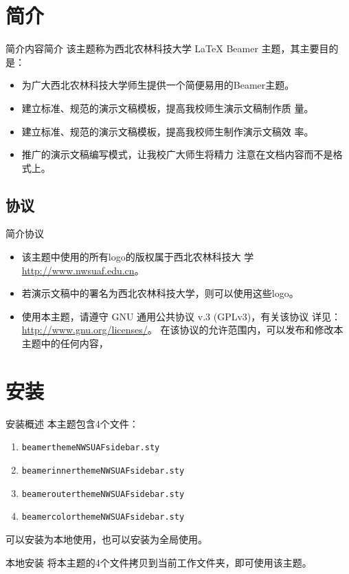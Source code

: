 \section{简介}
\begin{frame}{简介}{内容简介}
  该主题称为\alert{西北农林科技大学 {\LaTeX} Beamer 主题}，其主要目的
  是：
  \begin{itemize}
  \item<1-> 为广大西北农林科技大学师生提供一个简便易用的Beamer主题。
  \item<2-> 建立标准、规范的演示文稿模板，提高我校师生演示文稿制作质
    量。
  \item<3-> 建立标准、规范的演示文稿模板，提高我校师生制作演示文稿效
    率。
  \item<4-> 推广的演示文稿编写模式，让我校广大师生将精力
    注意在文档内容而不是格式上。
  \end{itemize}
\end{frame}

\subsection{协议}
\begin{frame}{简介}{协议}
  \begin{itemize}
  \item<1-> 该主题中使用的所有logo的版权属于西北农林科技大
    学\href{http://www.nwsuaf.edu.cn}{http://www.nwsuaf.edu.cn}。
  \item<2-> 若演示文稿中的署名为西北农林科技大学，则可以使用这些logo。
  \item<3-> 使用本主题，请遵守 GNU 通用公共协议 v.3 (GPLv3)，有关该协议
    详见：
    \href{http://www.gnu.org/licenses/}{http://www.gnu.org/licenses/}。
    在该协议的允许范围内，可以发布和修改本主题中的任何内容，
  \end{itemize}
\end{frame}

\section{安装}
\begin{frame}{安装}{概述}
  本主题包含4个文件：
  \begin{enumerate}
  \item {\tt beamerthemeNWSUAFsidebar.sty}
  \item {\tt beamerinnerthemeNWSUAFsidebar.sty}
  \item {\tt beamerouterthemeNWSUAFsidebar.sty}
  \item {\tt beamercolorthemeNWSUAFsidebar.sty}
  \end{enumerate}
  可以安装为本地使用，也可以安装为全局使用。\pause
  \begin{block}{本地安装}
    将本主题的4个文件拷贝到当前工作文件夹，即可使用该主题。
  \end{block}
\end{frame}

